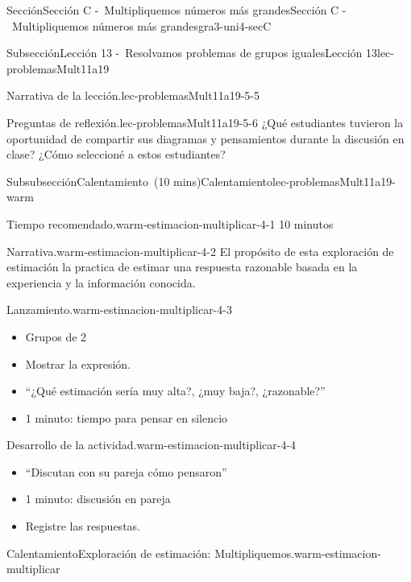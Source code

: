 \documentclass[oneside,10pt,]{article}
\begin{document}
\begin{sectionptx}{Sección}{Sección C -~Multipliquemos números más grandes}{}{Sección C -~Multipliquemos números más grandes}{}{}{gra3-uni4-secC}
\begin{subsectionptx}{Subsección}{Lección 13 -~Resolvamos problemas de grupos iguales}{}{Lección 13}{}{}{lec-problemasMult11a19}
\begin{introduction}{}
\begin{paragraphs}{Narrativa de la lección.}{lec-problemasMult11a19-5-5}
\end{paragraphs}%
\begin{paragraphs}{Preguntas de reflexión.}{lec-problemasMult11a19-5-6}%
¿Qué estudiantes tuvieron la oportunidad de compartir sus diagramas y pensamientos durante la discusión en clase? ¿Cómo seleccioné a estos estudiantes?%
\end{paragraphs}%
\end{introduction}%
%
%
\typeout{************************************************}
\typeout{************************************************}
%
\begin{subsubsectionptx}{Subsubsección}{Calentamiento~(10 mins)}{}{Calentamiento}{}{}{lec-problemasMult11a19-warm}
\par
\begin{paragraphs}{Tiempo recomendado.}{warm-estimacion-multiplicar-4-1}%
10 minutos%
\end{paragraphs}%
\begin{paragraphs}{Narrativa.}{warm-estimacion-multiplicar-4-2}%
El propósito de esta exploración de estimación la practica de estimar una respuesta razonable basada en la experiencia y la información conocida.%
\end{paragraphs}%
\begin{paragraphs}{Lanzamiento.}{warm-estimacion-multiplicar-4-3}%
%
\begin{itemize}[label=\textbullet]
\item{}Grupos de 2%
\item{}Mostrar la expresión.%
\item{}``¿Qué estimación sería muy alta?, ¿muy baja?, ¿razonable?''%
\item{}1 minuto: tiempo para pensar en silencio%
\end{itemize}
\end{paragraphs}%
\begin{paragraphs}{Desarrollo de la actividad.}{warm-estimacion-multiplicar-4-4}%
%
\begin{itemize}[label=\textbullet]
\item{}``Discutan con su pareja cómo pensaron''%
\item{}1 minuto: discusión en pareja%
\item{}Registre las respuestas.%
\end{itemize}
\end{paragraphs}%
\begin{exploration}{Calentamiento}{Exploración de estimación: Multipliquemos.}{warm-estimacion-multiplicar}%

\end{exploration}
\end{subsubsectionptx}
\end{subsectionptx}
\end{sectionptx}
\end{document}
